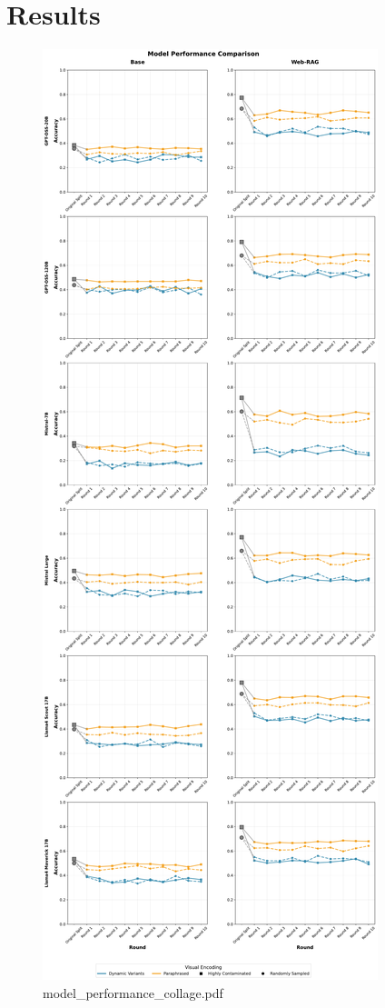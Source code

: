 \section{Results}

\begin{figure}[htbp]
    \centering
    \includegraphics[width=\columnwidth]{res/model_performance_collage.pdf}
    \caption{model\_performance\_collage.pdf}
    \label{fig:model_performance_collage}
\end{figure}

